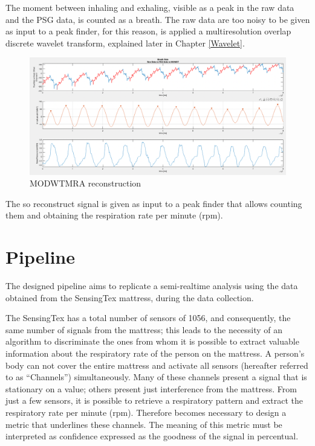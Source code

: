 \vspace*{0.5cm}

The moment between inhaling and exhaling, visible as a peak in the raw data and the PSG data, is counted as a breath. The raw data are too noisy to be given as input to a peak finder, for this reason, is applied a multiresolution overlap discrete wavelet transform, explained later in Chapter \ref{Wavelet}.

\vspace*{0.5cm}

\begin{figure}[H]
    \centering    
    \includegraphics[width=\textwidth]{img/sensomative_manu.png}
    \caption{MODWTMRA reconstruction}
    \label{fig:seonsmativeDataManu}
 
\end{figure}

The so reconstruct signal is given as input to a peak finder that allows counting them and obtaining the respiration rate per minute (rpm).

\section{Pipeline}\label{cap:pipeline}
The designed pipeline aims to replicate a semi-realtime analysis using the data obtained from the SensingTex mattress, during the data collection. \newline

The SensingTex has a total number of sensors of 1056, and consequently, the same number of signals from the mattress; this leads to the necessity of an algorithm to discriminate the ones from whom it is possible to extract valuable information about the respiratory rate of the person on the mattress. A person's body can not cover the entire mattress and activate all sensors (hereafter referred to as “Channels”) simultaneously.
Many of these channels present a signal that is stationary on a value; others present just interference from the mattress. From just a few sensors, it is possible to retrieve a respiratory pattern and extract the respiratory rate per minute (rpm). Therefore becomes necessary to design a metric that underlines these channels. The meaning of this metric must be interpreted as confidence expressed as the goodness of the signal in percentual.


